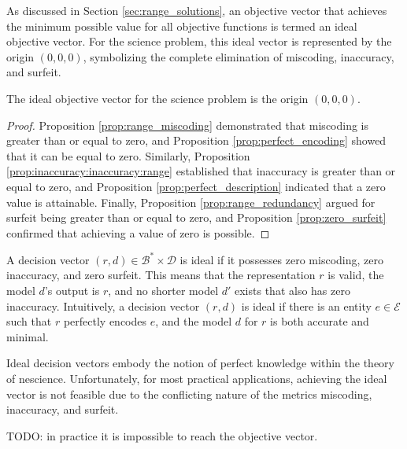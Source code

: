 As discussed in Section \ref{sec:range_solutions}, an objective vector that achieves the minimum possible value for all objective functions is termed an ideal objective vector. For the science problem, this ideal vector is represented by the origin $(0, 0, 0)$, symbolizing the complete elimination of miscoding, inaccuracy, and surfeit.

\begin{proposition}
The ideal objective vector for the science problem is the origin $(0, 0, 0)$.
\end{proposition}
\begin{proof}
Proposition \ref{prop:range_miscoding} demonstrated that miscoding is greater than or equal to zero, and Proposition \ref{prop:perfect_encoding} showed that it can be equal to zero. Similarly, Proposition \ref{prop:inaccuracy:inaccuracy:range} established that inaccuracy is greater than or equal to zero, and Proposition \ref{prop:perfect_description} indicated that a zero value is attainable. Finally, Proposition \ref{prop:range_redundancy} argued for surfeit being greater than or equal to zero, and Proposition \ref{prop:zero_surfeit} confirmed that achieving a value of zero is possible.
\end{proof}

A decision vector $(r, d) \in \mathcal{B}^\ast \times \mathcal{D}$ is ideal if it possesses zero miscoding, zero inaccuracy, and zero surfeit. This means that the representation $r$ is valid, the model $d$'s output is $r$, and no shorter model $d'$ exists that also has zero inaccuracy. Intuitively, a decision vector $(r, d)$ is ideal if there is an entity $e \in \mathcal{E}$ such that $r$ perfectly encodes $e$, and the model $d$ for $r$ is both accurate and minimal.

Ideal decision vectors embody the notion of perfect knowledge within the theory of nescience. Unfortunately, for most practical applications, achieving the ideal vector is not feasible due to the conflicting nature of the metrics miscoding, inaccuracy, and surfeit.

\begin{example}
{\color{red} TODO: in practice it is impossible to reach the objective vector.}
\end{example}


